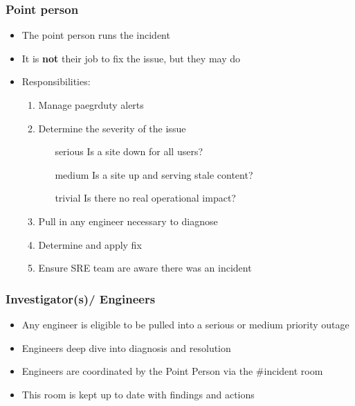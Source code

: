 \documentclass[]{beamer}
\begin{document}
\begin{frame}
  \frametitle{Point person}

  \begin{itemize}[<+->]
  \item The point person runs the incident
  \item It is \textbf{not} their job to fix the issue, but they may do
  \item Responsibilities:

    \begin{enumerate}
    \item Manage paegrduty alerts
    \item Determine the severity of the issue

      \begin{itemize}
      \item[serious] Is a site down for all users?
      \item[medium] Is a site up and serving stale content?
      \item[trivial] Is there no real operational impact?
      \end{itemize}

    \item Pull in any engineer necessary to diagnose
    \item Determine and apply fix
    \item Ensure SRE team are aware there was an incident
    \end{enumerate}

  \end{itemize}

\end{frame}

\begin{frame}
  \frametitle{Investigator(s)/ Engineers}

  \begin{itemize}[<+->]
  \item Any engineer is eligible to be pulled into a serious or medium priority outage
  \item Engineers deep dive into diagnosis and resolution
  \item Engineers are coordinated by the Point Person via the #incident room
  \item This room is kept up to date with findings and actions
  \end{itemize}

\end{frame}
\end{document}
